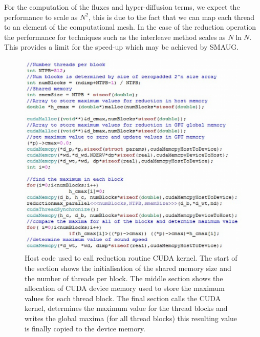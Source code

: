 For the computation of the fluxes and hyper-diffusion terms, we expect the performance to scale as $N^{2}$, this is due to the fact that we can map each thread to an element of the computational mesh. In the case of the reduction operation the performance for techniques such as the interleave method scales as $N \ln N$. This provides a limit for the speed-up which may be achieved by SMAUG.

\begin{figure}[h]
\includegraphics[scale=0.75]{cucomputemaxc_fig4}
\caption{Host code used to call reduction routine CUDA kernel. The start of the section shows the initialisation of the shared memory size and the number of threads per block. The middle section shows the allocation of CUDA device memory used to store the maximum values for each thread block. The final section calls the CUDA kernel, determines the maximum value for the thread blocks and writes the global maxima (for all thread blocks)  this resulting value is finally copied to the device memory. }
\end{figure}

